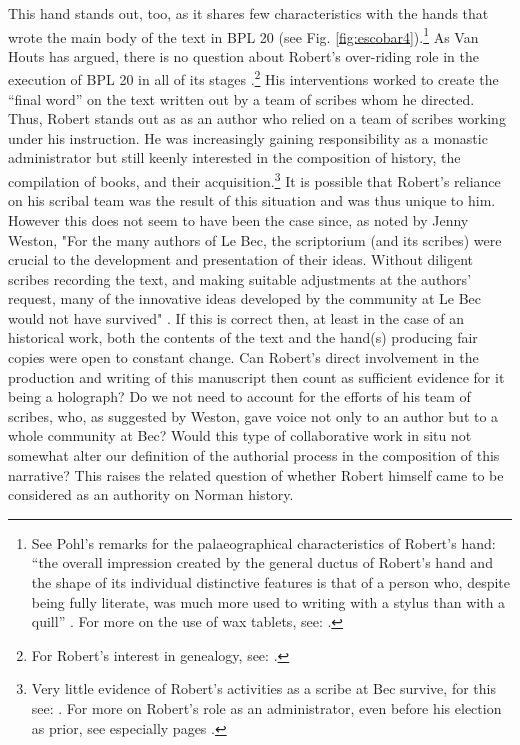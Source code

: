 \documentclass{article}
\begin{document}
This hand stands out, too, as it shares few characteristics with the
hands that wrote the main body of the text in BPL 20 (see Fig.
\ref{fig:escobar4}).\footnote{See Pohl's remarks for the palaeographical characteristics
  of Robert's hand: ``the overall impression created by the general
  ductus of Robert's hand and the shape of its individual distinctive
  features is that of a person who, despite being fully literate, was
  much more used to writing with a stylus than with a quill'' \citep[76--77]{pohl_abbas_2014}. For more on the use of wax tablets, see: \cite{rouse_vocabulary_1990}.} As Van Houts has argued, there is no question about Robert's
over-riding role in the execution of BPL 20 in all of its stages \citep[cx]{van_houts_gesta_1992}.\footnote{For Robert's interest in genealogy, see: \cite{van_houts_robert_1989}.} His interventions worked to create the ``final word'' on
the text written out by a team of scribes whom he directed. Thus, Robert
stands out as as an author who relied on a team of scribes working under
his instruction. He was increasingly gaining responsibility as a
monastic administrator but still keenly interested in the composition of
history, the compilation of books, and their acquisition.\footnote{Very
  little evidence of Robert's activities as a scribe at Bec survive, for
  this see: \cite[105]{pohl_robert_2018}. For more on Robert's role as an
  administrator, even before his election as prior, see especially pages \cite[117--119]{pohl_robert_2018}.} It is possible that Robert's reliance on his scribal team
was the result of this situation and was thus unique to him. However
this does not seem to have been the case since, as noted by Jenny
Weston, "For the many authors of Le Bec, the scriptorium (and its
scribes) were crucial to the development and presentation of their
ideas. Without diligent scribes recording the text, and making suitable
adjustments at the authors' request, many of the innovative ideas
developed by the community at Le Bec would not have survived" \citep[159--160]{weston_manuscripts_2017}. If this is correct then, at least in the case of an
historical work, both the contents of the text and the hand(s) producing
fair copies were open to constant change. Can Robert's direct
involvement in the production and writing of this manuscript then count
as sufficient evidence for it being a holograph? Do we not need to
account for the efforts of his team of scribes, who, as suggested by
Weston, gave voice not only to an author but to a whole community at
Bec? Would this type of collaborative work in situ not somewhat alter
our definition of the authorial process in the composition of this
narrative? This raises the related question of whether Robert himself
came to be considered as an authority on Norman history.
\end{document}
